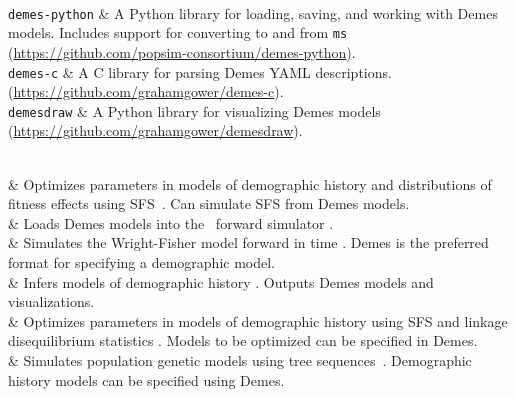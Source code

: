 \toprule
{}\\
\midrule
\texttt{demes-python} &
    A Python library for loading, saving, and working with
    Demes models. Includes support for converting to and from
    \texttt{ms}~\citep{hudson2002generating}
    (\url{https://github.com/popsim-consortium/demes-python}).\\

\texttt{demes-c} &
    A C library for parsing Demes YAML descriptions.
    (\url{https://github.com/grahamgower/demes-c}). \\

\texttt{demesdraw} &
    A Python library for visualizing Demes models
    (\url{https://github.com/grahamgower/demesdraw}). \\

\midrule
{}\\
\midrule


\dadi &
   Optimizes parameters in models of demographic history and distributions of fitness effects using SFS~\citep{gutenkunst2009inferring}. Can simulate SFS from Demes models.
    \\
    
\demesslim &
    Loads Demes models into the \slim\ forward simulator \citep{haller2019slim}.\\
    
\fwdpy &
   Simulates the Wright-Fisher model forward in time \citep{thornton2014cpp,thornton2019-nu}. Demes is the preferred format for specifying a demographic model.\\

\gadma &
    Infers models of demographic history \citep{noskova2020gadma}. Outputs Demes models and visualizations. \\

\moments &
    Optimizes parameters in models of demographic history using SFS and linkage disequilibrium statistics
    \citep{jouganous2017inferring,ragsdale2019models}. Models to be optimized can be specified in Demes.\\

\msprime &
    Simulates population genetic models using tree sequences~\citep{kelleher2016efficient,kelleher2020coalescent,baumdicker2021-iu}. Demographic history models can be specified using Demes.\\

\bottomrule   
